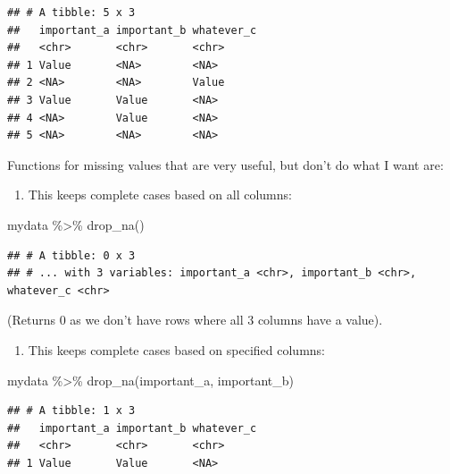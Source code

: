 \documentclass[
]{book}
\newenvironment{Shaded}{\begin{snugshade}}{\end{snugshade}}
\newcommand{\FunctionTok}[1]{\textcolor[rgb]{0.00,0.00,0.00}{#1}}
\newcommand{\NormalTok}[1]{#1}
\newcommand{\SpecialCharTok}[1]{\textcolor[rgb]{0.00,0.00,0.00}{#1}}
\providecommand{\tightlist}{%
  \setlength{\itemsep}{0pt}\setlength{\parskip}{0pt}}
\begin{document}
\begin{verbatim}
## # A tibble: 5 x 3
##   important_a important_b whatever_c
##   <chr>       <chr>       <chr>     
## 1 Value       <NA>        <NA>      
## 2 <NA>        <NA>        Value     
## 3 Value       Value       <NA>      
## 4 <NA>        Value       <NA>      
## 5 <NA>        <NA>        <NA>
\end{verbatim}

Functions for missing values that are very useful, but don't do what I want are:

\begin{enumerate}
\def\labelenumi{(\arabic{enumi})}
\tightlist
\item
  This keeps complete cases based on all columns:
\end{enumerate}

\begin{Shaded}
\begin{Highlighting}[]
\NormalTok{mydata }\SpecialCharTok{\%\textgreater{}\%} 
  \FunctionTok{drop\_na}\NormalTok{()}
\end{Highlighting}
\end{Shaded}

\begin{verbatim}
## # A tibble: 0 x 3
## # ... with 3 variables: important_a <chr>, important_b <chr>, whatever_c <chr>
\end{verbatim}

(Returns 0 as we don't have rows where all 3 columns have a value).

\begin{enumerate}
\def\labelenumi{(\arabic{enumi})}
\setcounter{enumi}{1}
\tightlist
\item
  This keeps complete cases based on specified columns:
\end{enumerate}

\begin{Shaded}
\begin{Highlighting}[]
\NormalTok{mydata }\SpecialCharTok{\%\textgreater{}\%} 
  \FunctionTok{drop\_na}\NormalTok{(important\_a, important\_b)}
\end{Highlighting}
\end{Shaded}

\begin{verbatim}
## # A tibble: 1 x 3
##   important_a important_b whatever_c
##   <chr>       <chr>       <chr>     
## 1 Value       Value       <NA>
\end{verbatim}
\end{document}

